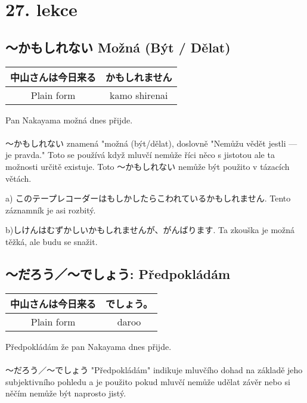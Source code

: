 \section{27. lekce}
 \label{sec:lekce_27}
\subsection{〜かもしれない Možná (Být / Dělat)}

\begin{center}
\begin{tabular}{|| c | c ||}
中山さんは今日来る & かもしれません\\
\hline
Plain form & kamo shirenai \\
\end{tabular}
\end{center}

Pan Nakayama možná dnes přijde.

\paragraph{}〜かもしれない znamená "možná (být/dělat), doslovně "Nemůžu vědět jestli --- je pravda." Toto se používá když mluvčí nemůže říci něco s jistotou ale ta možnosti určitě existuje. Toto 〜かもしれない nemůže být použito v tázacích větách. 

a) このテープレコーダーはもしかしたらこわれているかもしれません.   Tento záznamník je asi rozbitý. 

b)しけんはむずかしいかもしれませんが、がんばります. Ta zkouška je možná těžká, ale budu se snažit.

\subsection{〜だろう／〜でしょう: Předpokládám}

\begin{center}
\begin{tabular}{|| c | c ||}
中山さんは今日来る & でしょう。\\
\hline
Plain form & daroo \\
\end{tabular}
\end{center}

Předpokládám že pan Nakayama dnes přijde.

\paragraph{} 〜だろう／〜でしょう  "Předpokládám" indikuje mluvčího dohad na základě jeho subjektivního pohledu a je použito pokud mluvčí nemůže udělat závěr nebo si něčím nemůže být naprosto jistý.

